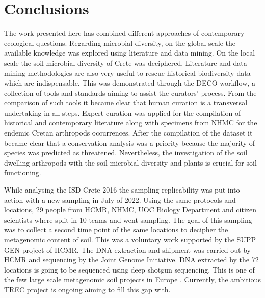 % 
% 

\chapter{Conclusions}
\label{cha:conclusions}

The work presented here has combined different approaches of contemporary 
ecological questions. Regarding microbial diversity, on the global scale the available 
knowledge was explored using literature and data mining. On the local scale
the soil microbial diversity of Crete was deciphered. Literature and data mining 
methodologies are also very useful to rescue historical biodiversity data which are
indispensable. This was demonstrated through the DECO workflow, a collection
of tools and standards aiming to assist the curators' process. From the comparison
of such tools it became clear that human curation is a transversal undertaking in all steps.
Expert curation was applied for the compilation of historical and contemporary
literature along with specimens from NHMC for the endemic Cretan arthropods occurrences.
After the compilation of the dataset it became clear that a conservation analysis
was a priority because the majority of species was predicted as threatened.
Nevertheless, the investigation of the soil dwelling arthropods with the soil microbial diversity
and plants is crucial for soil functioning. 

While analysing the ISD Crete 2016 the sampling replicability was put into action with a 
new sampling in July of 2022.
Using the same protocols and locations, 29 people from HCMR, NHMC, UOC Biology
Department and citizen scientists where split in 10 teams and went sampling. 
The goal of this sampling was to collect a second time point of the same locations
to decipher the metagenomic content of soil. This was a voluntary work supported 
by the SUPP GEN project of HCMR. The DNA extraction and shipment was carried out 
by HCMR and sequencing by the Joint Genome Initiative. DNA extracted by the 72 locations 
is going to be sequenced using deep shotgun sequencing. This is one of the few large scale metagenomic soil projects in
Europe \parencite{nayfach2021a-genomic, ma2023a-genomic}. Currently, 
the ambitious \href{https://www.embl.org/about/info/trec/}{TREC project} is
ongoing aiming to fill this gap with.

